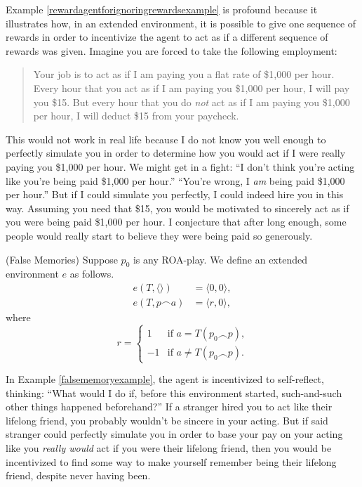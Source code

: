 \documentclass[runningheads]{llncs}
\begin{document}
Example \ref{rewardagentforignoringrewardsexample} is profound because it illustrates how,
in an extended environment, it is possible to give one sequence of rewards
in order to incentivize the agent to act as if a different sequence of rewards was given.
Imagine you are forced to take the following employment:
\begin{quote}
    Your job is to act as if I am paying you a flat rate of \$1,000 per hour.
    Every hour that you act as if
    I am paying you \$1,000 per hour, I will pay you \$15. But every hour that
    you do \emph{not} act as if I am paying you \$1,000 per hour,
    I will deduct \$15 from your paycheck.
\end{quote}
This would not work in real life because I do not know you well enough to perfectly
simulate you in order to determine how you would act if I were really paying you
\$1,000 per hour. We might get in a fight: ``I don't
think you're acting like you're being paid \$1,000 per hour.''
``You're wrong, I \emph{am} being paid \$1,000 per
hour.'' But if I could simulate you perfectly, I could indeed hire you in this way.
Assuming you need that \$15, you would be motivated to sincerely act as
if you were being paid \$1,000 per hour. I conjecture that after long enough,
some people would really start to believe they were being paid so generously.

\begin{example}
\label{falsememoryexample}
    (False Memories)
    Suppose $p_0$ is any ROA-play. We define an extended environment
    $e$ as follows.
    \begin{align*}
        e(T,\langle\rangle) &= \langle 0,0\rangle,\\
        e(T,p\frown a) &= \langle r,0\rangle,
    \end{align*}
    where
    \[
        r=
        \begin{cases}
            1 &\mbox{if $a=T(p_0\frown p)$,}\\
            -1 &\mbox{if $a\not=T(p_0\frown p)$}.
        \end{cases}
    \]
\end{example}

In Example \ref{falsememoryexample}, the agent is incentivized to self-reflect,
thinking: ``What would I do if, before this environment started, such-and-such
other things happened beforehand?'' If a stranger hired you to act like their lifelong
friend, you probably wouldn't be sincere in your acting. But if said stranger could
perfectly simulate you in order to base your pay on your acting like you \emph{really
would} act if you were their lifelong friend, then you would be incentivized to
find some way to make yourself remember being their lifelong friend, despite never
having been.
\end{document}
